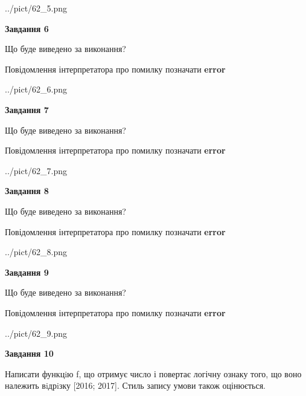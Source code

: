 \documentclass[12pt, ukrainian]{article}
\begin{document}
{\begin {large}
\begin{center}
	{../pict/62_5.png}
\end{center}
\newpage

{\begin {center}\textbf{Завдання 6}\end {center}}\par
Що буде виведено за виконання? \par
Повідомлення інтерпретатора про помилку позначати \textbf{error}

\begin{center}
	{../pict/62_6.png}
\end{center}
\newpage

{\begin {center}\textbf{Завдання 7}\end {center}}\par
Що буде виведено за виконання? \par
Повідомлення інтерпретатора про помилку позначати \textbf{error}

\begin{center}
	{../pict/62_7.png}
\end{center}
\newpage

{\begin {center}\textbf{Завдання 8}\end {center}}\par
Що буде виведено за виконання? \par
Повідомлення інтерпретатора про помилку позначати \textbf{error}

\begin{center}
	{../pict/62_8.png}
\end{center}
\newpage

{\begin {center}\textbf{Завдання 9}\end {center}}\par
Що буде виведено за виконання? \par
Повідомлення інтерпретатора про помилку позначати \textbf{error}

\begin{center}
	{../pict/62_9.png}
\end{center}
\newpage

{\begin {center}\textbf{Завдання 10}\end {center}}\par

Написати функцiю f, що отримує число і повертає логічну ознаку того, що воно належить вiдрiзку [2016; 2017]. Стиль запису умови також оцінюється.\par
\newpage

\end {large}}
\end{document}

